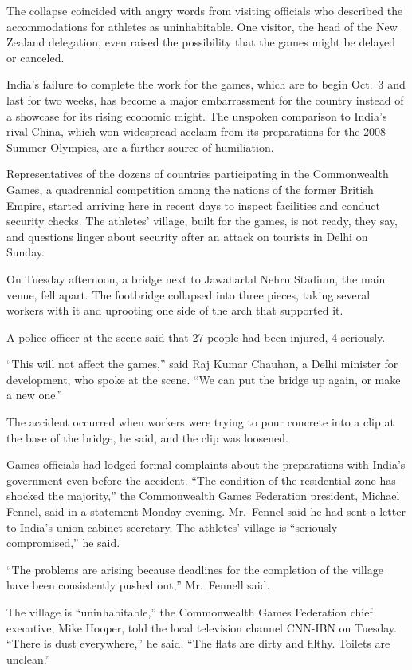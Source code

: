 ﻿\documentclass[12pt]{article}
\begin{document}
The collapse coincided with angry words from visiting officials who described the accommodations for
athletes as uninhabitable. One visitor, the head of the New Zealand delegation, even raised the
possibility that the games might be delayed or canceled.

India's failure to complete the work for the games, which are to begin Oct.~3 and last for two
weeks, has become a major embarrassment for the country instead of a showcase for its rising
economic might. The unspoken comparison to India's rival China, which won widespread acclaim from
its preparations for the 2008 Summer Olympics, are a further source of humiliation.

Representatives of the dozens of countries participating in the Commonwealth Games, a quadrennial
competition among the nations of the former British Empire, started arriving here in recent days to
inspect facilities and conduct security checks. The athletes' village, built for the games, is not
ready, they say, and questions linger about security after an attack on tourists in Delhi on Sunday.

On Tuesday afternoon, a bridge next to Jawaharlal Nehru Stadium, the main venue, fell apart. The
footbridge collapsed into three pieces, taking several workers with it and uprooting one side of the
arch that supported it.

A police officer at the scene said that 27 people had been injured, 4 seriously.

``This will not affect the games,'' said Raj Kumar Chauhan, a Delhi minister for development, who
spoke at the scene. ``We can put the bridge up again, or make a new one.''

The accident occurred when workers were trying to pour concrete into a clip at the base of the
bridge, he said, and the clip was loosened.

Games officials had lodged formal complaints about the preparations with India's government even
before the accident. ``The condition of the residential zone has shocked the majority,'' the
Commonwealth Games Federation president, Michael Fennel, said in a statement Monday evening.
Mr.~Fennel said he had sent a letter to India's union cabinet secretary. The athletes' village is
``seriously compromised,'' he said.

``The problems are arising because deadlines for the completion of the village have been
consistently pushed out,'' Mr.~Fennell said.

The village is ``uninhabitable,'' the Commonwealth Games Federation chief executive, Mike Hooper,
told the local television channel CNN-IBN on Tuesday. ``There is dust everywhere,'' he said. ``The
flats are dirty and filthy. Toilets are unclean.''
\end{document}
